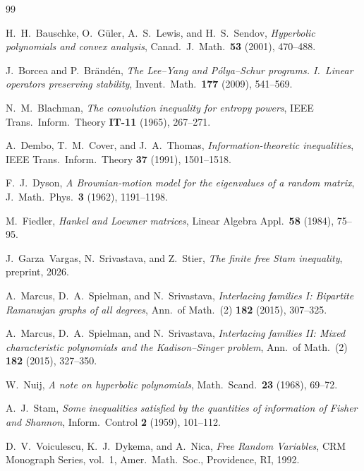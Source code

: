 \documentclass[10pt,a4paper]{amsart}
\theoremstyle{plain}
\theoremstyle{definition}
\theoremstyle{remark}
\begin{document}
\begin{thebibliography}{99}

H.~H.~Bauschke, O.~G\"uler, A.~S.~Lewis,
and H.~S.~Sendov,
\emph{Hyperbolic polynomials and convex analysis},
Canad.\ J.\ Math.\ \textbf{53} (2001), 470--488.

J.~Borcea and P.~Br\"and\'en,
\emph{The {L}ee--{Y}ang and {P}\'olya--{S}chur programs.
{I}.\ {L}inear operators preserving stability},
Invent.\ Math.\ \textbf{177} (2009), 541--569.

N.~M.~Blachman,
\emph{The convolution inequality for entropy powers},
IEEE Trans.\ Inform.\ Theory \textbf{IT-11} (1965),
267--271.

A.~Dembo, T.~M.~Cover, and J.~A.~Thomas,
\emph{Information-theoretic inequalities},
IEEE Trans.\ Inform.\ Theory \textbf{37} (1991),
1501--1518.

F.~J.~Dyson,
\emph{A {B}rownian-motion model for the eigenvalues
of a random matrix},
J.~Math.\ Phys.\ \textbf{3} (1962), 1191--1198.

M.~Fiedler,
\emph{Hankel and {L}oewner matrices},
Linear Algebra Appl.\ \textbf{58} (1984), 75--95.

J.~Garza~Vargas, N.~Srivastava, and Z.~Stier,
\emph{The finite free {S}tam inequality},
preprint, 2026.

A.~Marcus, D.~A.~Spielman, and N.~Srivastava,
\emph{Interlacing families {I}: Bipartite {R}amanujan
graphs of all degrees},
Ann.\ of Math.\ (2) \textbf{182} (2015), 307--325.

A.~Marcus, D.~A.~Spielman, and N.~Srivastava,
\emph{Interlacing families {II}: Mixed characteristic
polynomials and the {K}adison--{S}inger problem},
Ann.\ of Math.\ (2) \textbf{182} (2015), 327--350.

W.~Nuij,
\emph{A note on hyperbolic polynomials},
Math.\ Scand.\ \textbf{23} (1968), 69--72.

A.~J.~Stam,
\emph{Some inequalities satisfied by the quantities of
information of {F}isher and {S}hannon},
Inform.\ Control \textbf{2} (1959), 101--112.

D.~V.~Voiculescu, K.~J.~Dykema, and A.~Nica,
\emph{Free Random Variables},
CRM Monograph Series, vol.~1, Amer.\ Math.\ Soc.,
Providence, RI, 1992.

\end{thebibliography}
\end{document}
